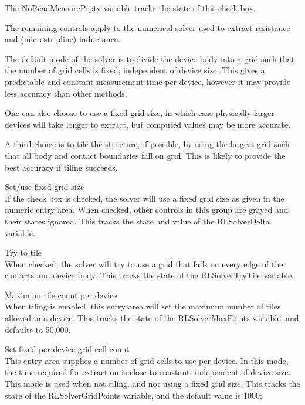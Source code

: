 \begin{description}
The {\et NoReadMeasurePrpty} variable tracks the state of this check
box.
\end{description}

The remaining controls apply to the numerical solver used to extract
resistance and (microstripline) inductance.

The default mode of the solver is to divide the device body into a
grid such that the number of grid cells is fixed, independent of
device size.  This gives a predictable and constant measurement time
per device, however it may provide less accuracy than other methods.

One can also choose to use a fixed grid size, in which case physically
larger devices will take longer to extract, but computed values may be
more accurate.

A third choice is to tile the structure, if possible, by using the
largest grid such that all body and contact boundaries fall on grid. 
This is likely to provide the best accuracy if tiling succeeds.

\begin{description}
\item{\cb Set/use fixed grid size}\\
If the check box is checked, the solver will use a fixed grid size as
given in the numeric entry area.  When checked, other controls in this
group are grayed and their states ignored.  This tracks the state and
value of the {\et RLSolverDelta} variable.

\item{\cb Try to tile}\\
When checked, the solver will try to use a grid that falls on every
edge of the contacts and device body.  This tracks the state of the
{\et RLSolverTryTile} variable.

\item{\cb Maximum tile count per device}\\
When tiling is enabled, this entry area will set the maximum number of
tiles allowed in a device.  This tracks the state of the {\et
RLSolverMaxPoints} variable, and defaults to 50,000.

\item{\cb Set fixed per-device grid cell count}\\
This entry area supplies a number of grid cells to use per device.  In
this mode, the time required for extraction is close to constant,
independent of device size.  This mode is used when not tiling, and
not using a fixed grid size.  This tracks the state of the {\et
RLSolverGridPoints} variable, and the default value is 1000;
\end{description}


